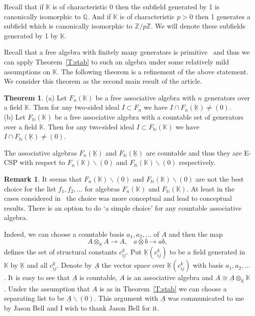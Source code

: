 \documentclass{amsart} \textwidth=18.0cm \oddsidemargin=-1cm \evensidemargin=-1cm \topmargin=-1cm \textheight=23cm
\theoremstyle{definition}
\newtheorem{theorem}{Theorem}
\newtheorem{remark}{Remark}
\begin{document}
Recall that if $\mathbb K$ is of characteristic 0 then the subfield generated by 1 is canonically isomorphic to $\mathbb Q$. 
And if $\mathbb K$ is of characteristic $p>0$ then 1 generates a subfield which is canonically isomorphic to $\mathbb Z/p\mathbb Z$. 
We will denote these subfields generated by 1 by $\underline{\mathbb K}$.

Recall that a free algebra with finitely many generators is primitive~\cite{BC, Ph} and thus we can apply Theorem~\ref{T:stab} to such an algebra under some relatively mild assumptions on $\mathbb K$. 
The following theorem is a refinement of the above statement. 
We consider this theorem as the second main result of the article. 
\begin{theorem} \label{T:free}
(a) Let $F_n(\mathbb K)$ be a free associative algebra with $n$ generators over a field $\mathbb K$. 
Then for any two-sided ideal $I\subset F_n$ we have $I\cap F_n(\underline{\mathbb K})\ne(0)$.\\
(b) Let $F_{\mathbb N}(\mathbb K)$ be a free associative algebra with a countable set of generators over a field $\mathbb K$. Then for any two-sided ideal $I\subset F_{\mathbb N}(\mathbb K)$ we have $I\cap F_{\mathbb N}(\underline{\mathbb K})\ne(0)$.
\end{theorem}
The associative algebras $F_n(\underline{\mathbb K})$ and $F_{\mathbb N}(\underline{\mathbb K})$ are countable and thus they are E-CSP with respect to $F_n(\mathbb K)\backslash(0)$ and $F_{\mathbb N}(\mathbb K)\backslash(0)$ respectively. 

\begin{remark}
It seems that $F_n(\mathbb K)\backslash(0)$ and $F_{\mathbb N}(\mathbb K)\backslash(0)$ are not the best choice for the list $f_1, f_2, \ldots$ for algebras $F_n(\mathbb K)$ and $F_{\mathbb N}(\mathbb K)$. 
At least in the cases considered in~\cite{PP1, PS2, IP} the choice was more conceptual and lead to conceptual results. There is an option to do `a simple choice' for any countable associative algebra. 

Indeed, we can choose a countable basis $a_1, a_2, \ldots$ of $A$ and then the map $$A\otimes_{\mathbb K}A\to A, \hspace{10pt}a\otimes b\to ab,$$ defines the set of structural constants $c_{ij}^k$. 
Put $\underline{\mathbb K}(c_{ij}^k)$ to be a field generated in $\mathbb K$ by $\underline{\mathbb K}$ and all $c_{ij}^k$. 
Denote by $\underline{A}$ the vector space over $\underline{\mathbb K}(c_{ij}^k)$ with basis $a_1, a_2,...$. It is easy to see that $\underline A$ is countable, $A$ is an associative algebra and  $A\cong\underline{A}\otimes_{\underline{\mathbb K}}\mathbb K$. 
Under the assumption that $A$ is as in Theorem~\ref{T:stab} we can choose a separating list to be $\underline{A}\backslash(0)$. 
This argument with $\underline{A}$ was communicated to me by Jason Bell and I wish to thank Jason Bell for it.
\end{remark}
\end{document}
